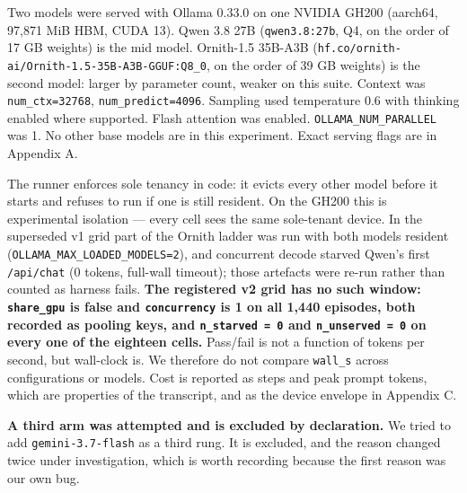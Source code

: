 \documentclass[
  10pt,
  a4paper,
]{article}
\let\oldtexttt\texttt
\renewcommand{\texttt}[1]{{\small\oldtexttt{#1}}}
\begin{document}
Two models were served with Ollama 0.33.0 on one NVIDIA GH200 (aarch64,
97,871 MiB HBM, CUDA 13). Qwen 3.8 27B (\texttt{qwen3.8:27b}, Q4, on the
order of 17 GB weights) is the mid model. Ornith-1.5 35B-A3B
(\texttt{hf.co/ornith-ai/Ornith-1.5-35B-A3B-GGUF:Q8\_0}, on the order of
39 GB weights) is the second model: larger by parameter count, weaker on
this suite. Context was \texttt{num\_ctx=32768},
\texttt{num\_predict=4096}. Sampling used temperature 0.6 with thinking
enabled where supported. Flash attention was enabled.
\texttt{OLLAMA\_NUM\_PARALLEL} was 1. No other base models are in this
experiment. Exact serving flags are in Appendix A.

The runner enforces sole tenancy in code: it evicts every other model
before it starts and refuses to run if one is still resident. On the
GH200 this is experimental isolation --- every cell sees the same
sole-tenant device. In the superseded v1 grid part of the Ornith ladder
was run with both models resident
(\texttt{OLLAMA\_MAX\_LOADED\_MODELS=2}), and concurrent decode starved
Qwen's first \texttt{/api/chat} (0 tokens, full-wall timeout); those
artefacts were re-run rather than counted as harness fails. \textbf{The
registered v2 grid has no such window: \texttt{share\_gpu} is false and
\texttt{concurrency} is 1 on all 1,440 episodes, both recorded as
pooling keys, and \texttt{n\_starved\ =\ 0} and
\texttt{n\_unserved\ =\ 0} on every one of the eighteen cells.}
Pass/fail is not a function of tokens per second, but wall-clock is. We
therefore do not compare \texttt{wall\_s} across configurations or
models. Cost is reported as steps and peak prompt tokens, which are
properties of the transcript, and as the device envelope in Appendix C.

\textbf{A third arm was attempted and is excluded by declaration.} We
tried to add \texttt{gemini-3.7-flash} as a third rung. It is excluded,
and the reason changed twice under investigation, which is worth
recording because the first reason was our own bug.
\end{document}
